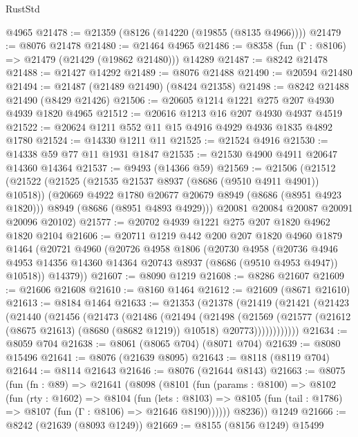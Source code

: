 \begin{lexlean}{RustStd}
\begin{coremodule}
    @4965
@21478 := @21359 (@8126 (@14220 (@19855 (@8135 @4966))))
@21479 := @8076 @21478
@21480 := @21464 @4965
@21486 := @8358 (fun (Γ : @8106) => @21479 (@21429 (@19862 @21480))) @14289
@21487 := @8242 @21478
@21488 := @21427 @14292
@21489 := @8076 @21488
@21490 := @20594 @21480
@21494 := @21487 (@21489 @21490) (@8424 @21358)
@21498 := @8242 @21488 @21490 (@8429 @21426)
@21506 := @20605 @1214 @1221 @275 @207 @4930 @4939 @1820 @4965
@21512 := @20616 @1213 @16 @207 @4930 @4937 @4519
@21522 := @20624 @1211 @552 @11 @15 @4916 @4929 @4936 @1835 @4892 @1780
@21524 := @14330 @1211 @11
@21525 := @21524 @4916
@21530 := @14338 @59 @77 @11 @1931 @1847
@21535 := @21530 @4900 @4911 @20647 @14360 @14364
@21537 := @9493 (@14366 @59)
@21569 := @21506
    (@21512
      (@21522
        (@21525 (@21535 @21537 @8937 (@8686 (@9510 @4911 @4901)) @10518))
        (@20669 @4922 @1780 @20677 @20679 @8949 (@8686 (@8951 @4923 @1820)))
        @8949
        (@8686 (@8951 @4893 @4929)))
      @20081
      @20084
      @20087
      @20091
      @20096
      @20102)
@21577 := @20702 @4939 @1221 @275 @207 @1820 @4962 @1820 @2104
@21606 := @20711
    @1219
    @442
    @200
    @207
    @1820
    @4960
    @1879
    @1464
    (@20721
      @4960
      (@20726
        @4958
        @1806
        (@20730
          @4958
          (@20736 @4946 @4953 @14356 @14360 @14364 @20743 @8937 (@8686 (@9510 @4953 @4947)) @10518))
        @14379))
@21607 := @8090 @1219
@21608 := @8286 @21607
@21609 := @21606 @21608
@21610 := @8160 @1464
@21612 := @21609 (@8671 @21610)
@21613 := @8184 @1464
@21633 := @21353
    (@21378
      (@21419
        (@21421
          (@21423
            (@21440
              (@21456
                (@21473
                  (@21486
                    (@21494
                      (@21498
                        (@21569
                          (@21577
                            (@21612 (@8675 @21613) (@8680 (@8682 @1219)) @10518)
                            @20773))))))))))))
@21634 := @8059 @704
@21638 := @8061 (@8065 @704) (@8071 @704)
@21639 := @8080 @15496
@21641 := @8076 (@21639 @8095)
@21643 := @8118 (@8119 @704)
@21644 := @8114 @21643
@21646 := @8076 (@21644 @8143)
@21663 := @8075
    (fun (fn : @89) =>
    @21641
      (@8098
        (@8101
          (fun (params : @8100) =>
          @8102
            (fun (rty : @1602) =>
            @8104
              (fun (lets : @8103) =>
              @8105 (fun (tail : @1786) => @8107 (fun (Γ : @8106) => @21646 @8190))))))
        @8236))
    @1249
@21666 := @8242 (@21639 (@8093 @1249))
@21669 := @8155 (@8156 @1249) @15499

\end{coremodule}
\end{lexlean}
